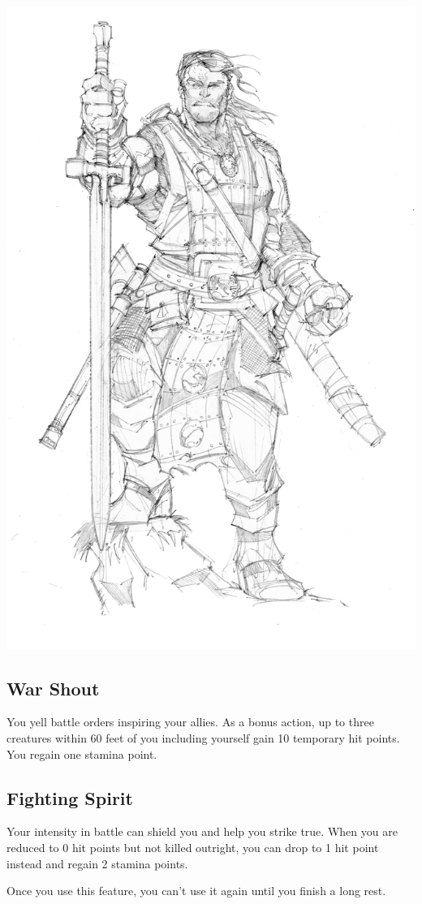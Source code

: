 \begin{multicols*}{2}
\begin{Figure}
\centering
\includegraphics[width=\textwidth]{img/fighter.png}
\end{Figure}

\subsection*{War Shout}

You yell battle orders inspiring your allies. 
As a bonus action, up to three creatures within 60 feet of you including yourself gain 10 temporary hit points.
You regain one stamina point.

\subsection*{Fighting Spirit}

Your intensity in battle can shield you and help you strike true. 
When you are reduced to 0 hit points but not killed outright, you can drop to 1 hit point instead and regain 2 stamina points.

Once you use this feature, you can’t use it again until you finish a long rest.

\end{multicols*}    

